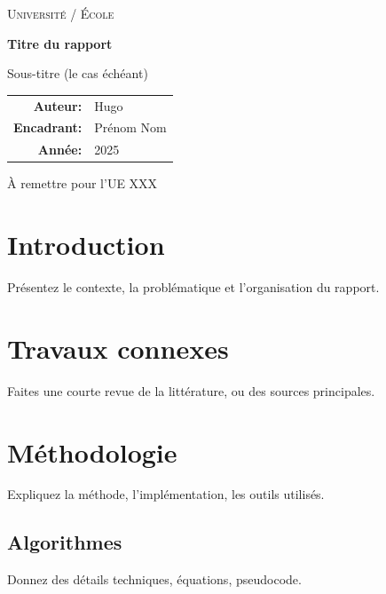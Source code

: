 \documentclass[11pt,a4paper]{article}
\begin{document}
\begin{titlepage}
  \centering
  \vspace*{2cm}
  {\scshape\LARGE Université / École \par}
  \vspace{1cm}
  {\huge\bfseries Titre du rapport \par}
  \vspace{1cm}
  {\Large Sous-titre (le cas échéant) \par}
  \vspace{2cm}
  \begin{tabular}{rl}
  \textbf{Auteur:} & Hugo \\
  \textbf{Encadrant:} & Prénom Nom \\
  \textbf{Année:} & 2025 \\
  \end{tabular}
  \vfill
  \vspace{0.8cm}
  {\small À remettre pour l'UE XXX}\
\end{titlepage}

\begin{abstract}
  Ici le résumé du rapport (100–250 mots). Expliquez brièvement le problème, la méthode et les résultats.
\end{abstract}

\tableofcontents
\clearpage

\section{Introduction}
Présentez le contexte, la problématique et l'organisation du rapport.

\section{Travaux connexes}
Faites une courte revue de la littérature, ou des sources principales.

\section{Méthodologie}
Expliquez la méthode, l'implémentation, les outils utilisés.

\subsection{Algorithmes}
Donnez des détails techniques, équations, pseudocode.
\end{document}
